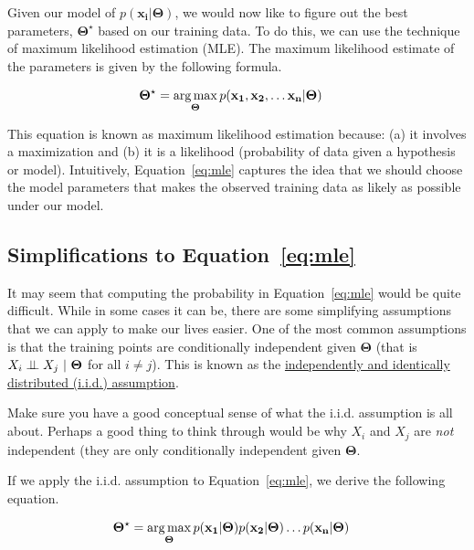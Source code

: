 \documentclass[assignment04_Solutions]{subfiles}
\begin{document}
Given our model of $p(\mathbf{x_i}|\mathbf{\Theta})$, we would now like to figure out the best parameters, $\mathbf{\Theta}^\star$ based on our training data.  To do this, we can use the technique of maximum likelihood estimation (MLE).  The maximum likelihood estimate of the parameters is given by the following formula.

\begin{align}
\mathbf{\Theta^\star} &= \operatorname*{arg\,max}_{\mathbf{\Theta}} p(\mathbf{x_1}, \mathbf{x_2}, \ldots \mathbf{x_n} | \mathbf{\Theta}) \label{eq:mle}
\end{align}

This equation is known as maximum likelihood estimation because: (a) it involves a maximization and (b) it is a likelihood (probability of data given a hypothesis or model).  Intuitively, Equation~\ref{eq:mle} captures the idea that we should choose the model parameters that makes the observed training data as likely as possible under our model.

\subsection{Simplifications to Equation~\ref{eq:mle}}

It may seem that computing the probability in Equation~\ref{eq:mle} would be quite difficult.   While in some cases it can be, there are some simplifying assumptions that we can apply to make our lives easier.  One of the most common assumptions is that the training points are conditionally independent given $\mathbf{\Theta}$ (that is $X_i \perp\!\!\!\perp X_j~|~\mathbf{\Theta}$ for all $i \neq j$).  This is known as the \href{https://en.wikipedia.org/wiki/Independent_and_identically_distributed_random_variables}{independently and identically distributed (i.i.d.) assumption}.

\begin{understandingcheck}
Make sure you have a good conceptual sense of what the i.i.d. assumption is all about.  Perhaps a good thing to think through would be why $X_i$ and $X_j$ are \emph{not} independent (they are only conditionally independent given $\mathbf{\Theta}$.
\end{understandingcheck}

If we apply the i.i.d. assumption to Equation~\ref{eq:mle}, we derive the following equation.

\begin{align}
\mathbf{\Theta^\star} &= \operatorname*{arg\,max}_{\mathbf{\Theta}} p(\mathbf{x_1} |  \mathbf{\Theta}) p(\mathbf{x_2} | \mathbf{\Theta}) \ldots p(\mathbf{x_n} | \mathbf{\Theta}) \label{eq:mleiid}
\end{align}
\end{document}
